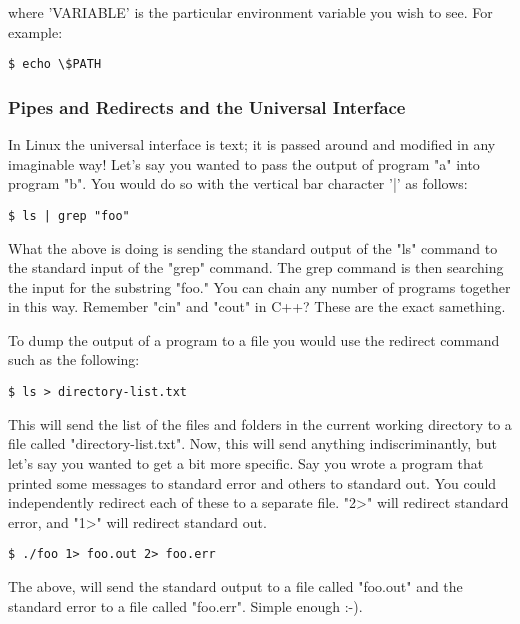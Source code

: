 \mdseries \noindent where 'VARIABLE' is the particular environment variable you wish to see.  For example:

\begin{lstlisting}
$ echo \$PATH
\end{lstlisting}


\subsubsection{Pipes and Redirects and the Universal Interface} \mdseries 
\mdseries \noindent In Linux the universal interface is text; it is passed around and modified in any imaginable way!  Let's say you wanted to pass the output of program "a" into program "b".  You would do so with the vertical bar character '|' as follows:
	
\begin{lstlisting}
$ ls | grep "foo"
\end{lstlisting}
	
\mdseries \noindent What the above is doing is sending the standard output of the "ls" command to the standard input of the "grep" command.  The grep command is then searching the input for the substring "foo."  You can chain any number of programs together in this way.  Remember "cin" and "cout" in C++? These are the exact samething.

\mdseries \noindent To dump the output of a program to a file you would use the redirect command such as the following:

\begin{lstlisting}
$ ls > directory-list.txt
\end{lstlisting}
	
\mdseries \noindent This will send the list of the files and folders in the current working directory to a file called "directory-list.txt".  Now, this will send anything indiscriminantly, but let's say you wanted to get a bit more specific.  Say you wrote a program that printed some messages to standard error and others to standard out.  You could independently redirect each of these to a separate file.  "2>" will redirect standard error, and "1>" will redirect standard out.

\begin{lstlisting}
$ ./foo 1> foo.out 2> foo.err
\end{lstlisting}
	
The above, will send the standard output to a file called "foo.out" and the standard error to a file called "foo.err".  Simple enough :-).

